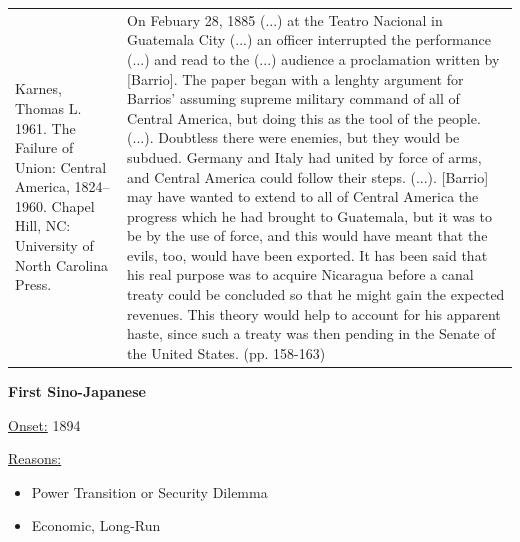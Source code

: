{\begin{longtable}{p{}p{}}
Karnes, Thomas L. 1961. The Failure of Union: Central America, 1824–1960. Chapel Hill, NC: University of North Carolina Press. & On Febuary 28, 1885 (...) at the Teatro Nacional in Guatemala City (...) an officer interrupted the performance (...) and read to the (...) audience a proclamation written by [Barrio]. The paper began with a lenghty argument for Barrios' assuming supreme military command of all of Central America, but doing this as the tool of the people. (...). Doubtless there were enemies, but they would be subdued. Germany and Italy had united by force of arms, and Central America could follow their steps.
(...).
[Barrio] may have wanted to extend to all of Central America the progress which he had brought to Guatemala, but it was to be by the use of force, and this would have meant that the evils, too, would have been exported. It has been said that his real purpose was to acquire Nicaragua before a canal treaty could be concluded so that he might gain the expected revenues. This theory would help to account for his apparent haste, since such a treaty was then pending in the Senate of the United States. (pp. 158-163)
\\
\end{longtable}}
\clearpage
         \textbf{First Sino-Japanese} 

          \underline{Onset:} 1894         

\underline{Reasons:}
\begin{itemize}
\item Power Transition or Security Dilemma
\item Economic, Long-Run
\end{itemize}

